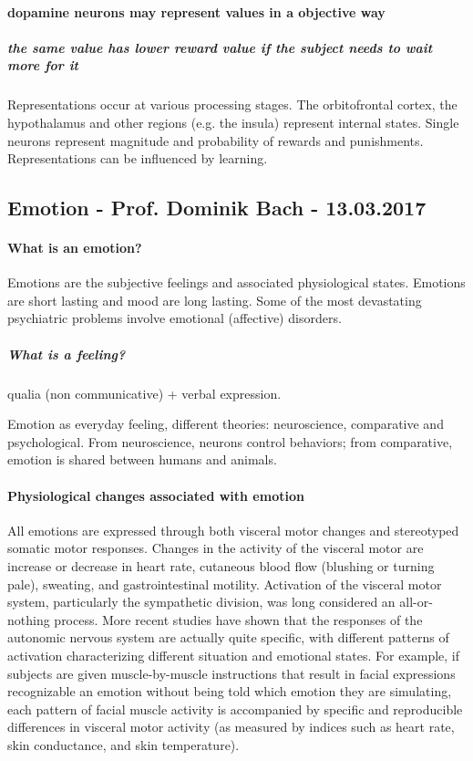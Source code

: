 \documentclass[12pt,article,oneside,a4paper]{memoir}
\begin{document}
\paragraph{dopamine neurons may represent values in a objective way}
\subparagraph{the same value has lower reward value if the subject needs to wait
more for it}

Representations occur at various processing stages. The orbitofrontal cortex,
the hypothalamus and other regions (e.g. the insula) represent internal states.
Single neurons represent magnitude and probability of rewards and punishments.
Representations can be influenced by learning.

\newpage
\subsection{Emotion - Prof. Dominik Bach - 13.03.2017}

\paragraph{What is an emotion?}
Emotions are the subjective feelings and associated physiological states.
Emotions are short lasting and mood are long lasting. Some of the most
devastating psychiatric problems involve emotional (affective) disorders.

\subparagraph{What is a feeling?}
qualia (non communicative) + verbal expression.

Emotion as everyday feeling, different theories: neuroscience, comparative and
psychological. From neuroscience, neurons control behaviors; from comparative, 
emotion is shared between humans and animals.

\paragraph{Physiological changes associated with emotion}
All emotions are expressed through both visceral motor changes and stereotyped
somatic motor responses. Changes in the activity of the visceral motor are 
increase or decrease in heart rate, cutaneous blood flow (blushing or turning 
pale), sweating, and gastrointestinal motility.
Activation of the visceral motor system, particularly the sympathetic division,
was long considered an all-or-nothing process. More recent studies have shown
that the responses of the autonomic nervous system are actually quite specific,
with different patterns of activation characterizing different situation and
emotional states. For example, if subjects are given muscle-by-muscle instructions
that result in facial expressions recognizable an emotion without being
told which emotion they are simulating, each pattern of facial muscle activity is
accompanied by specific and reproducible differences in visceral motor
activity (as measured by indices such as heart rate, skin conductance, and
skin temperature). 
\end{document}
